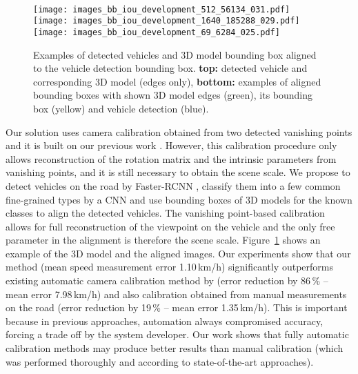 \documentclass[]{elsarticle}
\begin{document}
\begin{figure}[h]
	\centering
	\\[2pt]
	\texttt{[image: images\_bb\_iou\_development\_512\_56134\_031.pdf]}\hfill
	\texttt{[image: images\_bb\_iou\_development\_1640\_185288\_029.pdf]}\hfill
	\texttt{[image: images\_bb\_iou\_development\_69\_6284\_025.pdf]}\caption{Examples of detected vehicles and 3D model bounding box aligned to the vehicle detection bounding box. \textbf{top:} detected vehicle and corresponding 3D model (edges only), \textbf{bottom:} examples of aligned bounding boxes with shown 3D model edges (green), its bounding box (yellow) and vehicle detection (blue).}
	\label{fig:Teaser}
\end{figure}
Our solution uses camera calibration obtained from two detected vanishing points and it is built on our previous work \citep{Dubska2014,Dubska2015ITS}. However, this calibration procedure only allows  reconstruction of the rotation matrix and the intrinsic parameters from vanishing points, and it is still necessary to obtain the scene scale.  We propose to detect vehicles on the road by Faster-RCNN \citep{Girshick2015}, classify them into a few common fine-grained types by a CNN \citep{Krizhevsky2012} and use bounding boxes of 3D models for the known classes to align the detected vehicles.  The vanishing point-based calibration allows for full reconstruction of the viewpoint on the vehicle and the only free parameter in the alignment is therefore the scene scale. Figure~\ref{fig:Teaser} shows an example of the 3D model and the aligned images. Our experiments show that our method (mean speed measurement error 1.10\,km/h) significantly outperforms existing automatic camera calibration method by \citet{Dubska2014} (error reduction by 86\,\% -- mean error 7.98\,km/h) and also calibration obtained from manual measurements on the road (error reduction by 19\,\% -- mean error 1.35\,km/h). 
This is important because in previous approaches, automation always compromised accuracy, forcing a trade off by the system developer. Our work shows that fully automatic calibration methods may produce better results than manual calibration (which was performed thoroughly and according to state-of-the-art approaches).
\end{document}
